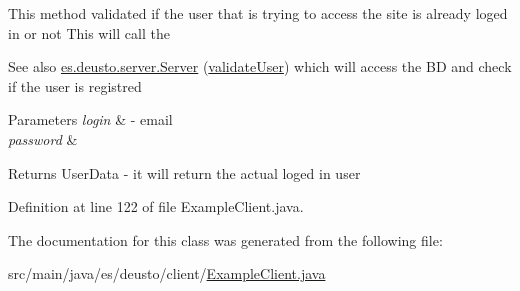 This method validated if the user that is trying to access the site is already loged in or not This will call the \begin{DoxySeeAlso}{See also}
\hyperlink{classes_1_1deusto_1_1server_1_1_server}{es.\+deusto.\+server.\+Server} (\hyperlink{classes_1_1deusto_1_1client_1_1_example_client_a740fa7000d0cd30603ce100b299ba8ba}{validate\+User}) which will access the BD and check if the user is registred 
\end{DoxySeeAlso}

\begin{DoxyParams}{Parameters}
{\em login} & -\/ email \\
\hline
{\em password} & \\
\hline
\end{DoxyParams}
\begin{DoxyReturn}{Returns}
User\+Data -\/ it will return the actual loged in user 
\end{DoxyReturn}


Definition at line 122 of file Example\+Client.\+java.



The documentation for this class was generated from the following file\+:\begin{DoxyCompactItemize}
\item 
src/main/java/es/deusto/client/\hyperlink{_example_client_8java}{Example\+Client.\+java}\end{DoxyCompactItemize}
